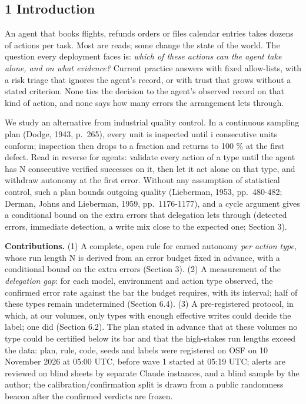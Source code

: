\subsection{1 Introduction}\label{introduction}

An agent that books flights, refunds orders or files calendar entries takes dozens of actions per task. Most are reads; some change the state of the world. The question every deployment faces is: \emph{which of these actions can the agent take alone, and on what evidence?} Current practice answers with fixed allow-lists, with a risk triage that ignores the agent's record, or with trust that grows without a stated criterion. None ties the decision to the agent's observed record on that kind of action, and none says how many errors the arrangement lets through.

We study an alternative from industrial quality control. In a continuous sampling plan (Dodge, 1943, p.~265), every unit is inspected until i consecutive units conform; inspection then drops to a fraction and returns to 100 \% at the first defect. Read in reverse for agents: validate every action of a type until the agent has N consecutive verified successes on it, then let it act alone on that type, and withdraw autonomy at the first error. Without any assumption of statistical control, such a plan bounds outgoing quality (Lieberman, 1953, pp.~480-482; Derman, Johns and Lieberman, 1959, pp.~1176-1177), and a cycle argument gives a conditional bound on the extra errors that delegation lets through (detected errors, immediate detection, a write mix close to the expected one; Section 3).

\textbf{Contributions.} (1) A complete, open rule for earned autonomy \emph{per action type}, whose run length N is derived from an error budget fixed in advance, with a conditional bound on the extra errors (Section 3). (2) A measurement of the \emph{delegation gap}: for each model, environment and action type observed, the confirmed error rate against the bar the budget requires, with its interval; half of these types remain undetermined (Section 6.4). (3) A pre-registered protocol, in which, at our volumes, only types with enough effective writes could decide the label; one did (Section 6.2). The plan stated in advance that at these volumes no type could be certified below its bar and that the high-stakes run lengths exceed the data: plan, rule, code, seeds and labels were registered on OSF on 10 November 2026 at 05:00 UTC, before wave 1 started at 05:19 UTC; alerts are reviewed on blind sheets by separate Claude instances, and a blind sample by the author; the calibration/confirmation split is drawn from a public randomness beacon after the confirmed verdicts are frozen.

